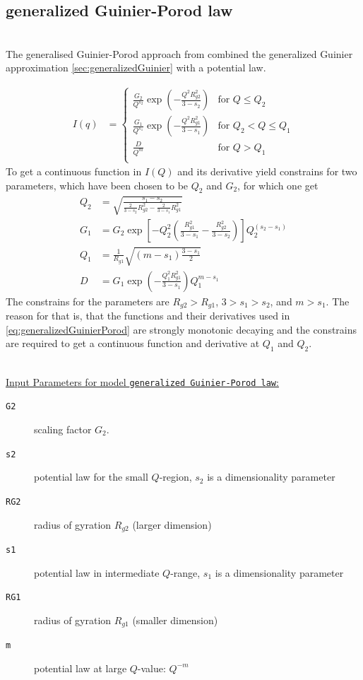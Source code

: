 \clearpage
\subsection{generalized Guinier-Porod law}
\label{sec:generalizedGuinierPorodLaw}  ~\\

The generalised Guinier-Porod approach from \cite{Hammouda2010} combined the  generalized Guinier approximation \ref{sec:generalizedGuinier} with a potential law.

\begin{align}
I(q) &=
\begin{cases}
  \frac{G_2}{Q^{s_2}} \exp\left(-\frac{Q^2R^2_{g2}}{3-s_2}\right)& \mbox{for } Q \leq Q_2\\
  \frac{G_1}{Q^{s_1}} \exp\left(-\frac{Q^2R^2_{g1}}{3-s_1}\right)& \mbox{for } Q_2 < Q\leq Q_1\\
  \frac{D}{Q^m} & \mbox{for } Q > Q_1 \\
\end{cases}
\label{eq:generalizedGuinierPorod}
\end{align}
To get a continuous function in $I(Q)$ and its derivative yield constrains for two parameters, which have been chosen to be $Q_2$ and $G_2$, for which one get
\begin{align}
Q_2 &= \sqrt{\frac{s_1-s_2}{\frac{2}{3-s_2}R^2_{g2}-\frac{2}{3-s_1}R^2_{g1}}}\\
G_1 &= G_2 \exp\left[-Q_2^2\left(\frac{R^2_{g1}}{3-s_1}-\frac{R_{g2}^2}{3-s_2}\right)\right] Q_2^{(s_2-s_1)} \\
Q_1 &= \frac{1}{R_{g1}}\sqrt{\left(m-s_1\right)\frac{3-s_1}{2}} \\
D   &= G_1 \exp\left(-\frac{Q_1^2 R_{g1}^2}{3-s_1}\right) Q_1^{m-s_1}
\label{eq:generalizedGuinierPorodConstrains}
\end{align}
The constrains for the parameters are $R_{g2}>R_{g1}$, $3>s_1>s_2$, and $m>s_1$. The reason for that is, that the functions and their derivatives used in \ref{eq:generalizedGuinierPorod} are strongly monotonic decaying and the constrains are required to get a continuous function and derivative at $Q_1$ and $Q_2$.

\hspace{1pt}\\
\underline{Input Parameters for model \texttt{generalized Guinier-Porod law}:}\\
\begin{description}
\item[\texttt{G2}] scaling factor $G_2$.
\item[\texttt{s2}] potential law for the small $Q$-region, $s_2$ is a dimensionality parameter
\item[\texttt{RG2}] radius of gyration $R_{g2}$ (larger dimension)
\item[\texttt{s1}] potential law in intermediate $Q$-range, $s_1$ is a dimensionality parameter
\item[\texttt{RG1}] radius of gyration $R_{g1}$ (smaller dimension)
\item[\texttt{m}] potential law at large $Q$-value: $Q^{-m}$
\end{description}


